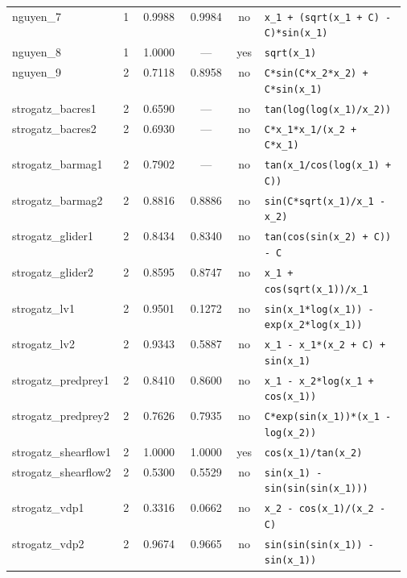\begin{footnotesize}
\begin{longtable}{p{0.215\linewidth} c c c c p{0.36\linewidth}}
nguyen\_7 & 1 & 0.9988 & 0.9984 & no & \texttt{x\_1 + (sqrt(x\_1 + C) - C)*sin(x\_1)} \\
nguyen\_8 & 1 & 1.0000 & --- & yes & \texttt{sqrt(x\_1)} \\
nguyen\_9 & 2 & 0.7118 & 0.8958 & no & \texttt{C*sin(C*x\_2*x\_2) + C*sin(x\_1)} \\
strogatz\_bacres1 & 2 & 0.6590 & --- & no & \texttt{tan(log(log(x\_1)/x\_2))} \\
strogatz\_bacres2 & 2 & 0.6930 & --- & no & \texttt{C*x\_1*x\_1/(x\_2 + C*x\_1)} \\
strogatz\_barmag1 & 2 & 0.7902 & --- & no & \texttt{tan(x\_1/cos(log(x\_1) + C))} \\
strogatz\_barmag2 & 2 & 0.8816 & 0.8886 & no & \texttt{sin(C*sqrt(x\_1)/x\_1 - x\_2)} \\
strogatz\_glider1 & 2 & 0.8434 & 0.8340 & no & \texttt{tan(cos(sin(x\_2) + C)) - C} \\
strogatz\_glider2 & 2 & 0.8595 & 0.8747 & no & \texttt{x\_1 + cos(sqrt(x\_1))/x\_1} \\
strogatz\_lv1 & 2 & 0.9501 & 0.1272 & no & \texttt{sin(x\_1*log(x\_1)) - exp(x\_2*log(x\_1))} \\
strogatz\_lv2 & 2 & 0.9343 & 0.5887 & no & \texttt{x\_1 - x\_1*(x\_2 + C) + sin(x\_1)} \\
strogatz\_predprey1 & 2 & 0.8410 & 0.8600 & no & \texttt{x\_1 - x\_2*log(x\_1 + cos(x\_1))} \\
strogatz\_predprey2 & 2 & 0.7626 & 0.7935 & no & \texttt{C*exp(sin(x\_1))*(x\_1 - log(x\_2))} \\
strogatz\_shearflow1 & 2 & 1.0000 & 1.0000 & yes & \texttt{cos(x\_1)/tan(x\_2)} \\
strogatz\_shearflow2 & 2 & 0.5300 & 0.5529 & no & \texttt{sin(x\_1) - sin(sin(sin(x\_1)))} \\
strogatz\_vdp1 & 2 & 0.3316 & 0.0662 & no & \texttt{x\_2 - cos(x\_1)/(x\_2 - C)} \\
strogatz\_vdp2 & 2 & 0.9674 & 0.9665 & no & \texttt{sin(sin(sin(x\_1)) - sin(x\_1))} \\
\end{longtable}
\end{footnotesize}
